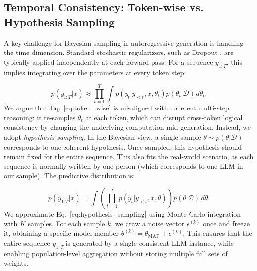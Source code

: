 \documentclass[11pt]{article}
\begin{document}
\subsection{Temporal Consistency: Token-wise vs. Hypothesis Sampling}
\label{sec:temporal_consistency}

A key challenge for Bayesian sampling in autoregressive generation is handling the time dimension. Standard stochastic regularizers, such as Dropout \citep{srivastava2014dropout}, are typically applied independently at each forward pass. For a sequence $y_{1:T}$, this implies integrating over the parameters at every token step:

\begin{equation}
    \label{eq:token_wise}
    p(y_{1:T}|x) \approx \prod_{t=1}^T \int p(y_t|y_{<t}, x, \theta_t) p(\theta_t|\mathcal{D}) \, d\theta_t.
\end{equation}
We argue that Eq.~\eqref{eq:token_wise} is misaligned with coherent multi-step reasoning: it re-samples $\theta_t$ at each token, which can disrupt cross-token logical consistency by changing the underlying computation mid-generation.
Instead, we adopt \emph{hypothesis sampling}. In the Bayesian view, a single sample $\theta \sim p(\theta|\mathcal{D})$ corresponds to one coherent hypothesis. Once sampled, this hypothesis should remain fixed for the entire sequence. 
This also fits the real-world scenario, as each sequence is normally written by one person (which corresponds to one LLM in our sample).
The predictive distribution is:

\begin{equation}
    \label{eq:hypothesis_sampling}
    p(y_{1:T}|x) = \int \left( \prod_{t=1}^T p(y_t|y_{<t}, x, \theta) \right) p(\theta|\mathcal{D}) \, d\theta.
\end{equation}
We approximate Eq.~\eqref{eq:hypothesis_sampling} using Monte Carlo integration with $K$ samples. For each sample $k$, we draw a noise vector $\epsilon^{(k)}$ once and freeze it, obtaining a specific model member $\theta^{(k)} = \theta_{\text{MAP}} + \epsilon^{(k)}$. This ensures that the entire sequence $y_{1:T}$ is generated by a single consistent LLM instance, while enabling population-level aggregation without storing multiple full sets of weights.
\end{document}
